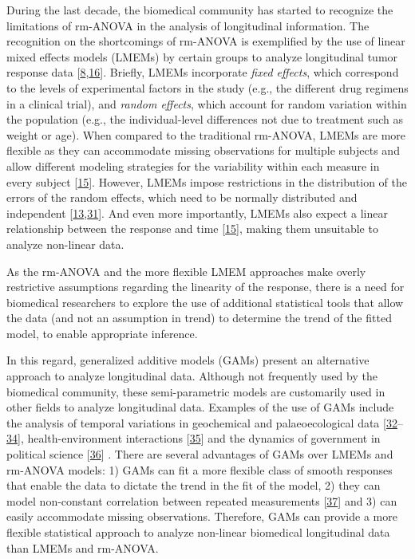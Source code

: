 \documentclass[
]{article}
\begin{document}
During the last decade, the biomedical community has started to recognize the limitations of rm-ANOVA in the analysis of longitudinal information. The recognition on the shortcomings of rm-ANOVA is exemplified by the use of linear mixed effects models (LMEMs) by certain groups to analyze longitudinal tumor response data {[}\protect\hyperlink{ref-skala2010}{8},\protect\hyperlink{ref-vishwanath2009}{16}{]}. Briefly, LMEMs incorporate \emph{fixed effects}, which correspond to the levels of experimental factors in the study (e.g., the different drug regimens in a clinical trial), and \emph{random effects}, which account for random variation within the population (e.g., the individual-level differences not due to treatment such as weight or age). When compared to the traditional rm-ANOVA, LMEMs are more flexible as they can accommodate missing observations for multiple subjects and allow different modeling strategies for the variability within each measure in every subject {[}\protect\hyperlink{ref-pinheiro2006}{15}{]}. However, LMEMs impose restrictions in the distribution of the errors of the random effects, which need to be normally distributed and independent {[}\protect\hyperlink{ref-gueorguieva2004}{13},\protect\hyperlink{ref-barr2013}{31}{]}. And even more importantly, LMEMs also expect a linear relationship between the response and time {[}\protect\hyperlink{ref-pinheiro2006}{15}{]}, making them unsuitable to analyze non-linear data.

As the rm-ANOVA and the more flexible LMEM approaches make overly restrictive assumptions regarding the linearity of the response, there is a need for biomedical researchers to explore the use of additional statistical tools that allow the data (and not an assumption in trend) to determine the trend of the fitted model, to enable appropriate inference.

In this regard, generalized additive models (GAMs) present an alternative approach to analyze longitudinal data. Although not frequently used by the biomedical community, these semi-parametric models are customarily used in other fields to analyze longitudinal data. Examples of the use of GAMs include the analysis of temporal variations in geochemical and palaeoecological data {[}\protect\hyperlink{ref-rose2012}{32}--\protect\hyperlink{ref-simpson2018}{34}{]}, health-environment interactions {[}\protect\hyperlink{ref-yang2012}{35}{]} and the dynamics of government in political science {[}\protect\hyperlink{ref-beck1998}{36}{]} . There are several advantages of GAMs over LMEMs and rm-ANOVA models: 1) GAMs can fit a more flexible class of smooth responses that enable the data to dictate the trend in the fit of the model, 2) they can model non-constant correlation between repeated measurements {[}\protect\hyperlink{ref-wood2017}{37}{]} and 3) can easily accommodate missing observations. Therefore, GAMs can provide a more flexible statistical approach to analyze non-linear biomedical longitudinal data than LMEMs and rm-ANOVA.
\end{document}
